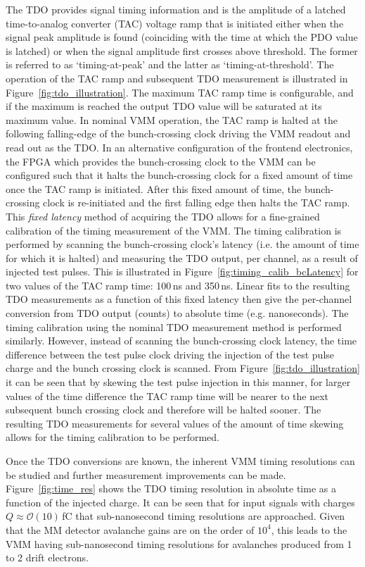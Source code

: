 The TDO provides signal timing information and is the amplitude of a latched
time-to-analog converter (TAC) voltage ramp that is initiated either when the signal peak
amplitude is found (coinciding with the time at which the PDO value is latched)
or when the signal amplitude first crosses above threshold.
The former is referred to as `timing-at-peak' and the latter as `timing-at-threshold'.
The operation of the TAC ramp and subsequent TDO measurement is illustrated
in Figure~\ref{fig:tdo_illustration}.
The maximum TAC ramp time is configurable, and if the maximum is reached the output
TDO value will be saturated at its maximum value.
In nominal VMM operation, the TAC ramp is halted at the following falling-edge
of the bunch-crossing clock driving the VMM readout and read out as the TDO.
In an alternative configuration of the frontend electronics, the FPGA which
provides the bunch-crossing clock to the VMM can be configured such that
it halts the bunch-crossing clock for a fixed amount of time once the TAC ramp is
initiated.
After this fixed amount of time, the bunch-crossing clock is re-initiated and the first
falling edge then halts the TAC ramp.
This \textit{fixed latency} method of acquiring the TDO allows
for a fine-grained calibration of the timing measurement of the VMM.
The timing calibration is performed by scanning the bunch-crossing clock's latency (i.e.
the amount of time for which it is halted) and measuring the TDO output, per channel,
as a result of injected test pulses.
This is illustrated in Figure~\ref{fig:timing_calib_bcLatency} for two values of the
TAC ramp time: 100\,ns and 350\,ns.
Linear fits to the resulting TDO measurements as a function of this fixed latency
then give the per-channel conversion from TDO output (counts) to absolute time (e.g. nanoseconds).
The timing calibration using the nominal TDO measurement method is performed similarly. However, instead
of scanning the bunch-crossing clock latency, the time difference between the test pulse clock driving
the injection of the test pulse charge and the bunch crossing clock is scanned.
From Figure~\ref{fig:tdo_illustration} it can be seen that by skewing the test pulse injection in
this manner, for larger values of the time difference the TAC ramp time will be nearer to the
next subsequent bunch crossing clock and therefore will be halted sooner.
The resulting TDO measurements for several values of the amount of time skewing allows for the
timing calibration to be performed.

Once the TDO conversions are known, the inherent VMM timing resolutions can be studied and
further measurement improvements can be made.
Figure~\ref{fig:time_res} shows the TDO timing resolution in absolute time as a function
of the injected charge.
It can be seen that for input signals with charges $Q \approx \mathcal{O}(10)$\,fC
that sub-nanosecond timing resolutions are approached.
Given that the MM detector avalanche gains are on the order of $10^4$, this
leads to the VMM having sub-nanosecond timing resolutions for avalanches produced
from 1 to 2 drift electrons.

